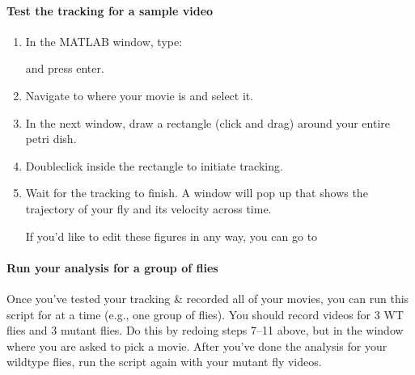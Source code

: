 \documentclass[letterpaper,10pt,english]{jupyterBook}
\begin{document}
\paragraph{Test the tracking for a sample video}
\label{\detokenize{Drosophila/Day1:test-the-tracking-for-a-sample-video}}\begin{enumerate}
%
\setcounter{enumi}{6}
\item {} 
\sphinxAtStartPar
In the MATLAB window, type:

\begin{sphinxVerbatim}[commandchars=\\\{\}]
\PYG{p}{[}\PYG{p}{]}
\end{sphinxVerbatim}

\sphinxAtStartPar
and press enter.

\item {} 
\sphinxAtStartPar
Navigate to where your movie is and select it.

\item {} 
\sphinxAtStartPar
In the next window, draw a rectangle (click and drag) around your entire petri dish.

\item {} 
\sphinxAtStartPar
Double\sphinxhyphen{}click inside the rectangle to initiate tracking.

\item {} 
\sphinxAtStartPar
Wait for the tracking to finish. A window will pop up that shows the trajectory of your fly and its velocity across time.

\sphinxAtStartPar
{} If you’d like to edit these figures in any way, you can go to 

\end{enumerate}


\paragraph{Run your analysis for a group of flies}
\label{\detokenize{Drosophila/Day1:run-your-analysis-for-a-group-of-flies}}
\sphinxAtStartPar
Once you’ve tested your tracking \& recorded all of your movies, you can run this script for  at a time (e.g., one group of flies). You should record videos for 3 WT flies and 3 mutant flies. Do this by re\sphinxhyphen{}doing steps 7–11 above, but  in the window where you are asked to pick a movie. After you’ve done the analysis for your wildtype flies, run the  script again with your mutant fly videos.
\end{document}
